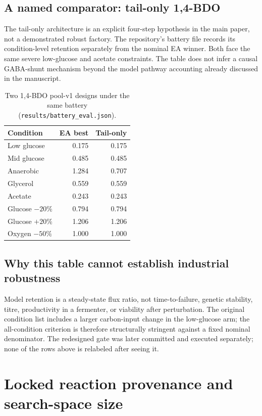 \subsection{A named comparator: tail-only 1,4-BDO}
The tail-only architecture is an explicit four-step hypothesis in the main paper, not a demonstrated robust factory. The repository's battery file records its condition-level retention separately from the nominal EA winner. Both face the same severe low-glucose and acetate constraints. The table does not infer a causal GABA-shunt mechanism beyond the model pathway accounting already discussed in the manuscript.
\begin{table}[!htbp]\centering\small\caption{Two 1,4-BDO pool-v1 designs under the same battery (\texttt{results/battery\_eval.json}).}\begin{tabular}{lrr}\hline Condition & EA best & Tail-only \\\hline
Low glucose & 0.175 & 0.175 \\
Mid glucose & 0.485 & 0.485 \\
Anaerobic & 1.284 & 0.707 \\
Glycerol & 0.559 & 0.559 \\
Acetate & 0.243 & 0.243 \\
Glucose $-20\%$ & 0.794 & 0.794 \\
Glucose $+20\%$ & 1.206 & 1.206 \\
Oxygen $-50\%$ & 1.000 & 1.000 \\
\hline\end{tabular}\end{table}
\subsection{Why this table cannot establish industrial robustness}
Model retention is a steady-state flux ratio, not time-to-failure, genetic stability, titre, productivity in a fermenter, or viability after perturbation. The original condition list includes a larger carbon-input change in the low-glucose arm; the all-condition criterion is therefore structurally stringent against a fixed nominal denominator. The redesigned gate was later committed and executed separately; none of the rows above is relabeled after seeing it.

\section{Locked reaction provenance and search-space size}
